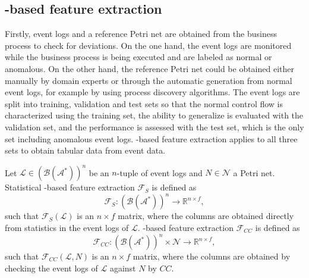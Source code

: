 \subsection{-based feature extraction}
Firstly, event logs and a reference Petri net are obtained from the business process to check for deviations. On the one hand, the event logs are monitored while the business process is being executed and are labeled as normal or anomalous. On the other hand, the reference Petri net could be obtained either manually by domain experts or through the automatic generation from normal event logs, for example by using process discovery algorithms. The event logs are split into training, validation and test sets so that the normal control flow is characterized using the training set, the ability to generalize is evaluated with the validation set, and the performance is assessed with the test set, which is the only set including anomalous event logs. -based feature extraction applies to all three sets to obtain tabular data from event data.
\begin{definition}
Let $\mathcal{L}\in(\mathcal{B}(\mathcal{A}^*))^n$ be an $n$-tuple of event logs and $N\in\mathcal{N}$ a Petri net. Statistical -based feature extraction $\mathcal{F}_S$ is defined as
\begin{equation}
\mathcal{F}_S:(\mathcal{B}(\mathcal{A}^*))^{n}\rightarrow\mathbb{R}^{n\times f},
\end{equation}
such that $\mathcal{F}_S(\mathcal{L})$ is an $n\times f$ matrix, where the columns are obtained directly from statistics in the event logs of $\mathcal{L}$.  -based feature extraction $\mathcal{F}_{CC}$ is defined as
\begin{equation}
\mathcal{F}_{CC}:(\mathcal{B}(\mathcal{A}^*))^{n}\times\mathcal{N}\rightarrow\mathbb{R}^{n\times f},
\end{equation}
such that $\mathcal{F}_{CC}(\mathcal{L},N)$ is an $n\times f$ matrix, where the columns are obtained by checking the event logs of $\mathcal{L}$ against $N$ by $CC$.
\end{definition}
